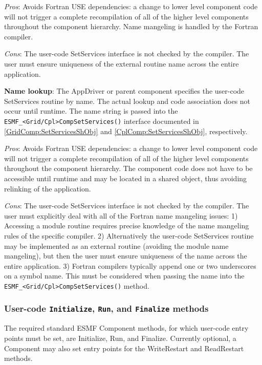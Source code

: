 \begin{itemize}
{\em Pros}: Avoids Fortran USE dependencies: a change to lower level component code will not trigger a complete recompilation of all of the higher level components throughout the component hierarchy. Name mangeling is handled by the Fortran compiler.

{\em Cons}: The user-code SetServices interface is not checked by the compiler. The user must ensure uniqueness of the external routine name across the entire application.

\begin{sloppypar}
\item {\bf Name lookup}: The AppDriver or parent component specifies the user-code SetServices routine by name. The actual lookup and code association does not occur until runtime. The name string is passed into the {\tt ESMF\_<Grid/Cpl>CompSetServices()} interface documented in \ref{GridComp:SetServicesShObj} and \ref{CplComp:SetServicesShObj}, respectively.

{\em Pros}: Avoids Fortran USE dependencies: a change to lower level component code will not trigger a complete recompilation of all of the higher level components throughout the component hierarchy. The component code does not have to be accessible until runtime and may be located in a shared object, thus avoiding relinking of the application.

{\em Cons}: The user-code SetServices interface is not checked by the compiler. The user must explicitly deal with all of the Fortran name mangeling issues: 1) Accessing a module routine requires precise knowledge of the name mangeling rules of the specific compiler. 2) Alternatively the user-code SetServices routine may be implemented as an external routine (avoiding the module name mangeling), but then the user must ensure uniqueness of the name across the entire application. 3) Fortran compilers typically append one or two underscores on a symbol name. This must be considered when passing the name into the {\tt ESMF\_<Grid/Cpl>CompSetServices()} method.

\end{sloppypar}
\end{itemize}


\subsubsection{User-code {\tt Initialize}, {\tt Run}, and {\tt Finalize} methods}

The required standard ESMF Component methods, for which user-code entry
points must be set, are Initialize, Run, and Finalize. Currently optional,
a Component may also set entry points for the WriteRestart and
ReadRestart methods.

